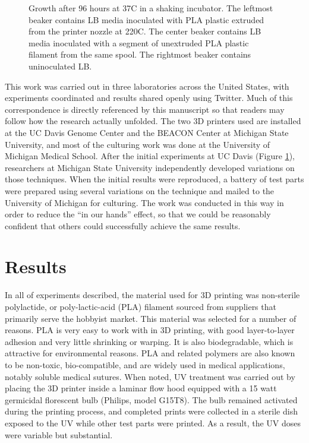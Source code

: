 \begin{refsection}
\begin{figure}
    \caption{ Growth after 96 hours at 37C in a shaking incubator. The
      leftmost beaker contains LB media inoculated with PLA plastic
      extruded from the printer nozzle at 220C. The center beaker
      contains LB media inoculated with a segment of unextruded PLA
      plastic filament from the same spool. The rightmost beaker
      contains uninoculated LB.}
    
    \label{fig:preliminary}
\end{figure}

This work was carried out in three laboratories across the United
States, with experiments coordinated and results shared openly using
Twitter. Much of this correspondence is directly referenced by this
manuscript so that readers may follow how the research actually
unfolded. The two 3D printers used are installed at the UC Davis
Genome Center and the BEACON Center at Michigan State University, and
most of the culturing work was done at the University of Michigan
Medical School. After the initial experiments at UC Davis (Figure
\ref{fig:preliminary}), researchers at Michigan State University
independently developed variations on those techniques. When the
initial results were reproduced, a battery of test parts were prepared
using several variations on the technique and mailed to the University
of Michigan for culturing. The work was conducted in this way in order
to reduce the ``in our hands'' effect, so that we could be reasonably
confident that others could successfully achieve the same results.


\section{Results}

In all of experiments described, the material used for 3D printing was
non-sterile polylactide, or poly-lactic-acid (PLA) filament sourced
from suppliers that primarily serve the hobbyist market. This material
was selected for a number of reasons. PLA is very easy to work with in
3D printing, with good layer-to-layer adhesion and very little
shrinking or warping. It is also biodegradable, which is attractive
for environmental reasons. PLA and related polymers are also known to
be non-toxic, bio-compatible, and are widely used in medical
applications, notably soluble medical sutures. When noted, UV
treatment was carried out by placing the 3D printer inside a laminar
flow hood equipped with a 15 watt germicidal florescent bulb (Philips,
model G15T8). The bulb remained activated during the printing process,
and completed prints were collected in a sterile dish exposed to the
UV while other test parts were printed. As a result, the UV doses were
variable but substantial.


\end{refsection}
